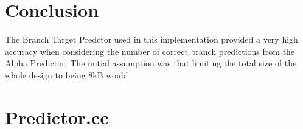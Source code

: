 \documentclass[twocolumn]{article}
\begin{document}
\section{Conclusion}
The Branch Target Predctor used in this implementation provided 
a very high accuracy when considering the number of correct 
branch predictions from the Alpha Predictor. The initial assumption
was that limiting the total size of the whole design to being 8kB
would 


\newpage
\onecolumn
\appendix
\section{Predictor.cc}

\end{document}
